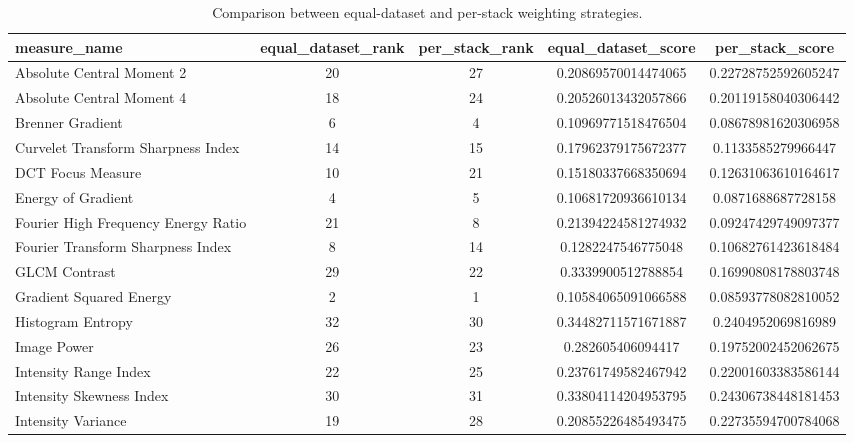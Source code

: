 \begin{table}[t]
\centering
\caption{Comparison between equal-dataset and per-stack weighting strategies.}
\begin{tabular}{lcccc}
\hline
measure_name & equal_dataset_rank & per_stack_rank & equal_dataset_score & per_stack_score \\
\hline
Absolute Central Moment 2 & 20 & 27 & 0.20869570014474065 & 0.22728752592605247 \\
Absolute Central Moment 4 & 18 & 24 & 0.20526013432057866 & 0.20119158040306442 \\
Brenner Gradient & 6 & 4 & 0.10969771518476504 & 0.08678981620306958 \\
Curvelet Transform Sharpness Index & 14 & 15 & 0.17962379175672377 & 0.1133585279966447 \\
DCT Focus Measure & 10 & 21 & 0.15180337668350694 & 0.12631063610164617 \\
Energy of Gradient & 4 & 5 & 0.10681720936610134 & 0.0871688687728158 \\
Fourier High Frequency Energy Ratio & 21 & 8 & 0.21394224581274932 & 0.09247429749097377 \\
Fourier Transform Sharpness Index & 8 & 14 & 0.1282247546775048 & 0.10682761423618484 \\
GLCM Contrast & 29 & 22 & 0.3339900512788854 & 0.16990808178803748 \\
Gradient Squared Energy & 2 & 1 & 0.10584065091066588 & 0.08593778082810052 \\
Histogram Entropy & 32 & 30 & 0.34482711571671887 & 0.2404952069816989 \\
Image Power & 26 & 23 & 0.282605406094417 & 0.19752002452062675 \\
Intensity Range Index & 22 & 25 & 0.23761749582467942 & 0.22001603383586144 \\
Intensity Skewness Index & 30 & 31 & 0.33804114204953795 & 0.24306738448181453 \\
Intensity Variance & 19 & 28 & 0.20855226485493475 & 0.22735594700784068 \\
\hline
\end{tabular}
\end{table}